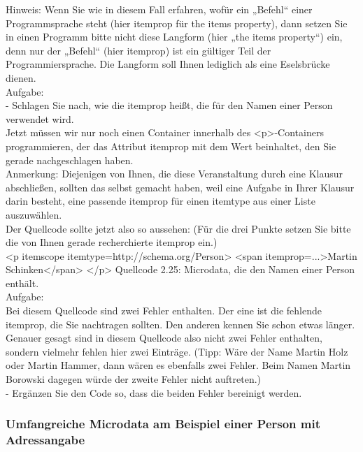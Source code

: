 Hinweis: Wenn Sie wie in diesem Fall  erfahren, wofür ein „Befehl“ einer Programmsprache steht (hier itemprop für the items property), dann setzen Sie in einen Programm bitte nicht diese Langform (hier „the items property“) ein, denn nur der „Befehl“ (hier itemprop) ist ein gültiger Teil der Programmiersprache. Die Langform soll Ihnen lediglich als eine Eselsbrücke dienen.\\

Aufgabe:\\

-	Schlagen Sie nach, wie die itemprop heißt, die für den Namen einer Person verwendet wird.\\

Jetzt müssen wir nur noch einen Container innerhalb des <p>-Containers programmieren, der das Attribut itemprop mit dem Wert beinhaltet, den Sie gerade nachgeschlagen haben. \\

Anmerkung: Diejenigen von Ihnen, die diese Veranstaltung durch eine Klausur abschließen, sollten das selbst gemacht haben, weil eine Aufgabe in Ihrer Klausur darin besteht, eine passende itemprop für einen itemtype aus einer Liste auszuwählen.\\

Der Quellcode sollte jetzt also so aussehen: (Für die drei Punkte setzen Sie bitte die von Ihnen gerade recherchierte itemprop ein.)\\

<p itemscope itemtype=http://schema.org/Person>
<span itemprop=...>Martin Schinken</span>
</p>
Quellcode 2.25: Microdata, die den Namen einer Person enthält.\\

Aufgabe:\\

Bei diesem Quellcode sind zwei Fehler enthalten. Der eine ist die fehlende itemprop, die Sie nachtragen sollten. Den anderen kennen Sie schon etwas länger. Genauer gesagt sind in diesem Quellcode also nicht zwei Fehler enthalten, sondern vielmehr fehlen hier zwei Einträge. (Tipp: Wäre der Name Martin Holz oder Martin Hammer, dann wären es ebenfalls zwei Fehler. Beim Namen Martin Borowski dagegen würde der zweite Fehler nicht auftreten.)\\

-	Ergänzen Sie den Code so, dass die beiden Fehler bereinigt werden.

\subsubsection{Umfangreiche Microdata am Beispiel einer Person mit Adressangabe}


